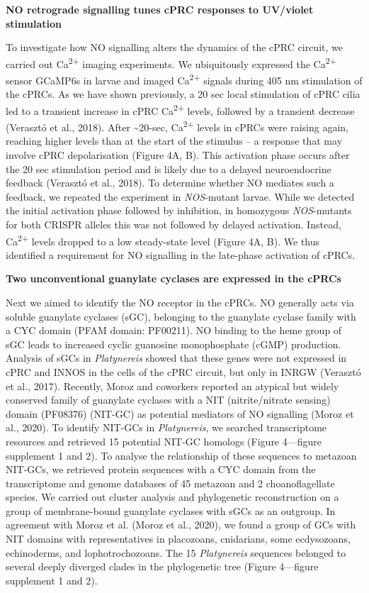\documentclass[
  10pt,
  onecolumn]{article}
\begin{document}
\textbf{NO retrograde signalling tunes cPRC responses to UV/violet
stimulation}

To investigate how NO signalling alters the dynamics of the cPRC
circuit, we carried out Ca\textsuperscript{2+} imaging experiments. We
ubiquitously expressed the Ca\textsuperscript{2+} sensor GCaMP6s in
larvae and imaged Ca\textsuperscript{2+} signals during 405 nm
stimulation of the cPRCs. As we have shown previously, a 20 sec local
stimulation of cPRC cilia led to a transient increase in cPRC
Ca\textsuperscript{2+} levels, followed by a transient decrease
(Verasztó et al., 2018). After \textasciitilde20-sec,
Ca\textsuperscript{2+} levels in cPRCs were raising again, reaching
higher levels than at the start of the stimulus -- a response that may
involve cPRC depolarisation (Figure 4A, B). This activation phase occurs
after the 20 sec stimulation period and is likely due to a delayed
neuroendocrine feedback (Verasztó et al., 2018). To determine whether NO
mediates such a feedback, we repeated the experiment in
\emph{NOS}-mutant larvae. While we detected the initial activation phase
followed by inhibition, in homozygous \emph{NOS}-mutants for both CRISPR
alleles this was not followed by delayed activation. Instead,
Ca\textsuperscript{2+} levels dropped to a low steady-state level
(Figure 4A, B). We thus identified a requirement for NO signalling in
the late-phase activation of cPRCs.

\textbf{Two unconventional guanylate cyclases are expressed in the
cPRCs}

Next we aimed to identify the NO receptor in the cPRCs. NO generally
acts via soluble guanylate cyclases (sGC), belonging to the guanylate
cyclase family with a CYC domain (PFAM domain: PF00211). NO binding to
the heme group of sGC leads to increased cyclic guanosine monophosphate
(cGMP) production. Analysis of sGCs in \emph{Platynereis} showed that
these genes were not expressed in cPRC and INNOS in the cells of the
cPRC circuit, but only in INRGW (Verasztó et al., 2017). Recently, Moroz
and coworkers reported an atypical but widely conserved family of
guanylate cyclases with a NIT (nitrite/nitrate sensing) domain (PF08376)
(NIT-GC) as potential mediators of NO signalling (Moroz et al., 2020).
To identify NIT-GCs in \emph{Platynereis}, we searched transcriptome
resources and retrieved 15 potential NIT-GC homologs (Figure 4---figure
supplement 1 and 2). To analyse the relationship of these sequences to
metazoan NIT-GCs, we retrieved protein sequences with a CYC domain from
the transcriptome and genome databases of 45 metazoan and 2
choanoflagellate species. We carried out cluster analysis and
phylogenetic reconstruction on a group of membrane-bound guanylate
cyclases with sGCs as an outgroup. In agreement with Moroz et al. (Moroz
et al., 2020), we found a group of GCs with NIT domains with
representatives in placozoans, cnidarians, some ecdysozoans,
echinoderms, and lophotrochozoans. The 15 \emph{Platynereis} sequences
belonged to several deeply diverged clades in the phylogenetic tree
(Figure 4---figure supplement 1 and 2).
\end{document}
